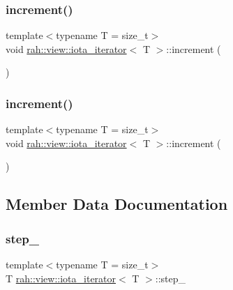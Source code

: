 \subsubsection{\texorpdfstring{increment()}{increment()}\hspace{0.1cm}{\footnotesize\ttfamily [1/2]}}
{\footnotesize\ttfamily template$<$typename T  = size\+\_\+t$>$ \\
void \mbox{\hyperlink{structrah_1_1view_1_1iota__iterator}{rah\+::view\+::iota\+\_\+iterator}}$<$ T $>$\+::increment (\begin{DoxyParamCaption}{ }\end{DoxyParamCaption})\hspace{0.3cm}{\ttfamily [inline]}}

\mbox{\label{structrah_1_1view_1_1iota__iterator_a52be6587654c9783137bf31d800f315d}} 
\subsubsection{\texorpdfstring{increment()}{increment()}\hspace{0.1cm}{\footnotesize\ttfamily [2/2]}}
{\footnotesize\ttfamily template$<$typename T  = size\+\_\+t$>$ \\
void \mbox{\hyperlink{structrah_1_1view_1_1iota__iterator}{rah\+::view\+::iota\+\_\+iterator}}$<$ T $>$\+::increment (\begin{DoxyParamCaption}{ }\end{DoxyParamCaption})\hspace{0.3cm}{\ttfamily [inline]}}



\subsection{Member Data Documentation}
\mbox{\label{structrah_1_1view_1_1iota__iterator_ac30abc689d8d82810bf78ceec3893bd2}} 
\subsubsection{\texorpdfstring{step\_}{step\_}}
{\footnotesize\ttfamily template$<$typename T  = size\+\_\+t$>$ \\
T \mbox{\hyperlink{structrah_1_1view_1_1iota__iterator}{rah\+::view\+::iota\+\_\+iterator}}$<$ T $>$\+::step\+\_\+}

